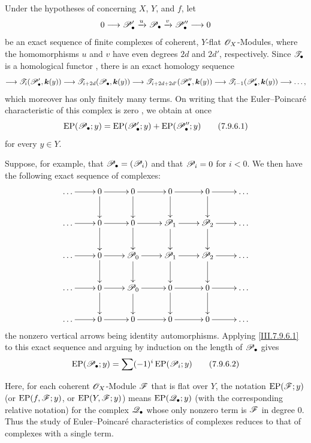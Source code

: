 \begin{env}[7.9.6]
\label{III.7.9.6}
Under the hypotheses of  concerning
$X$, $Y$, and $f$, let
\[
  0\longrightarrow\mathscr{P}'_\bullet
    \xrightarrow{u}\mathscr{P}_\bullet
    \xrightarrow{v}\mathscr{P}''_\bullet
    \longrightarrow 0
\]
be an exact sequence of finite complexes of coherent,
$Y$-flat $\mathscr{O}_X$-Modules, where the homomorphisms $u$
and $v$ have even degrees $2d$ and $2d'$, respectively.
Since $\mathscr{T}_\bullet$ is a homological functor
, there is an exact homology sequence
\[
  \longrightarrow
  \mathscr{T}_i(\mathscr{P}'_\bullet,\boldsymbol{k}(y))
  \longrightarrow
  \mathscr{T}_{i+2d}(\mathscr{P}_\bullet,\boldsymbol{k}(y))
  \longrightarrow
  \mathscr{T}_{i+2d+2d'}(\mathscr{P}''_\bullet,\boldsymbol{k}(y))
  \longrightarrow
  \mathscr{T}_{i-1}(\mathscr{P}'_\bullet,\boldsymbol{k}(y))
  \longrightarrow\ldots ,
\]
which moreover has only finitely many terms.  On writing
that the Euler--Poincar\'e characteristic of this complex is
zero , we obtain at once
\[
  \operatorname{EP}(\mathscr{P}_\bullet;y)
  =
  \operatorname{EP}(\mathscr{P}'_\bullet;y)
  +
  \operatorname{EP}(\mathscr{P}''_\bullet;y)
  \tag{7.9.6.1}\label{III.7.9.6.1}
\]
for every $y\in Y$.

Suppose, for example, that
$\mathscr{P}_\bullet=(\mathscr{P}_i)$ and that $\mathscr{P}_i=0$ for
$i<0$.  We then have the following exact sequence of
complexes:
\[
\xymatrix@C=2.4em{
  \ldots \ar[r] & 0 \ar[r]\ar[d] & 0 \ar[r]\ar[d]
    & 0 \ar[r]\ar[d] & 0 \ar[r]\ar[d] & \ldots \\
  \ldots \ar[r] & 0 \ar[r]\ar[d] & 0 \ar[r]\ar[d]
    & \sh{P}_1 \ar[r]\ar[d] & \sh{P}_2 \ar[r]\ar[d] & \ldots \\
  \ldots \ar[r] & 0 \ar[r]\ar[d] & \sh{P}_0 \ar[r]\ar[d]
    & \sh{P}_1 \ar[r]\ar[d] & \sh{P}_2 \ar[r]\ar[d] & \ldots \\
  \ldots \ar[r] & 0 \ar[r]\ar[d] & \sh{P}_0 \ar[r]\ar[d]
    & 0 \ar[r]\ar[d] & 0 \ar[r]\ar[d] & \ldots \\
  \ldots \ar[r] & 0 \ar[r] & 0 \ar[r]
    & 0 \ar[r] & 0 \ar[r] & \ldots
}
\]
the nonzero vertical arrows being identity automorphisms.
Applying \eqref{III.7.9.6.1} to this exact sequence and
arguing by induction on the length of $\mathscr{P}_\bullet$
gives
\[
  \operatorname{EP}(\mathscr{P}_\bullet;y)
  =
  \sum(- 1)^i\operatorname{EP}(\mathscr{P}_i;y)
  \tag{7.9.6.2}\label{III.7.9.6.2}
\]

Here, for each coherent $\mathscr{O}_X$-Module $\mathscr{F}$ that is
flat over $Y$, the notation
$\operatorname{EP}(\mathscr{F};y)$ (or
$\operatorname{EP}(f,\mathscr{F};y)$, or
$\operatorname{EP}(Y,\mathscr{F};y)$) means
$\operatorname{EP}(\mathscr{Q}_\bullet;y)$ (with the
corresponding relative notation) for the complex
$\mathscr{Q}_\bullet$ whose only nonzero term is $\mathscr{F}$ in
degree $0$.  Thus the study of Euler--Poincar\'e
characteristics of complexes reduces to that of complexes
with a single term.
\end{env}

